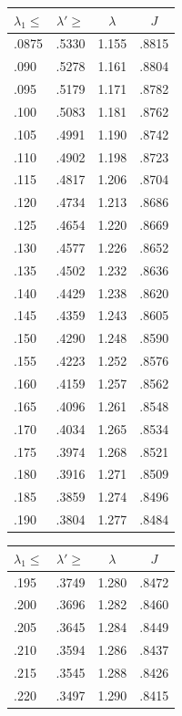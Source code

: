 \documentclass[12pt,psamsfonts]{amsart}
\theoremstyle{definition}
\theoremstyle{remark}
\numberwithin{equation}{section}
\begin{document}
\begin{table}
\begin{tabular}{l|c|c|c} 
 $\lambda_1 \leq$ & $\lambda' \geq$ & $\lambda$ & $J$ \\ 
 \hline 
 .0875 &  .5330 &  1.155 &  .8815 \\ 
 .090 &  .5278 &  1.161 &  .8804 \\ 
 .095 &  .5179 &  1.171 &  .8782 \\ 
 .100 &  .5083 &  1.181 &  .8762 \\ 
 .105 &  .4991 &  1.190 &  .8742 \\ 
 .110 &  .4902 &  1.198 &  .8723 \\ 
 .115 &  .4817 &  1.206 &  .8704 \\ 
 .120 &  .4734 &  1.213 &  .8686 \\ 
 .125 &  .4654 &  1.220 &  .8669 \\ 
 .130 &  .4577 &  1.226 &  .8652 \\ 
 .135 &  .4502 &  1.232 &  .8636 \\ 
 .140 &  .4429 &  1.238 &  .8620 \\ 
 .145 &  .4359 &  1.243 &  .8605 \\ 
 .150 &  .4290 &  1.248 &  .8590 \\ 
 .155 &  .4223 &  1.252 &  .8576 \\ 
 .160 &  .4159 &  1.257 &  .8562 \\ 
 .165 &  .4096 &  1.261 &  .8548 \\ 
 .170 &  .4034 &  1.265 &  .8534 \\ 
 .175 &  .3974 &  1.268 &  .8521 \\ 
 .180 &  .3916 &  1.271 &  .8509 \\ 
 .185 &  .3859 &  1.274 &  .8496 \\ 
  .190 &  .3804 &  1.277 &  .8484 \\ 
 \end{tabular}
 \qquad
 \begin{tabular}{l|c|c|c} 
 $\lambda_1 \leq$ & $\lambda' \geq$ & $\lambda$ & $J$ \\ 
 \hline 
 .195 &  .3749 &  1.280 &  .8472 \\ 
 .200 &  .3696 &  1.282 &  .8460 \\ 
 .205 &  .3645 &  1.284 &  .8449 \\ 
 .210 &  .3594 &  1.286 &  .8437 \\ 
 .215 &  .3545 &  1.288 &  .8426 \\ 
 .220 &  .3497 &  1.290 &  .8415 \\ 

\end{tabular}
\end{table}
\end{document}
